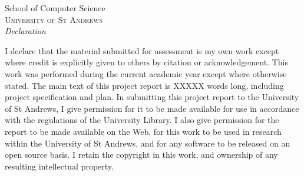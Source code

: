 \newpage
\thispagestyle{empty}

\begin{center}

\huge{School of Computer Science}\\[0.5cm]
\normalsize
\textsc{University of St Andrews}\\[2.0cm]

\emph{\LARGE Declaration}\\[2.5cm]
\end{center}
\normalsize I declare that the material submitted for assessment is my own work except where credit is explicitly given to others by citation or acknowledgement. This work was performed during the current academic year except where otherwise stated. The main text of this project report is XXXXX words long, including project specification and plan. In submitting this project report to the University of St Andrews, I give permission for it to be made available for use in accordance with the regulations of the University Library. I also give permission for the report to be made available on the Web, for this work to be used in research within the University of St Andrews, and for any software to be released on an open source basis. I retain the copyright in this work, and ownership of any resulting intellectual property.\\[1.0cm]

\vfill